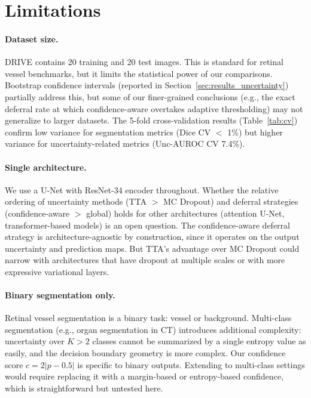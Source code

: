 \section{Limitations}
\label{sec:limitations}

\paragraph{Dataset size.} DRIVE contains 20 training and 20 test images.
This is standard for retinal vessel benchmarks, but it limits the statistical
power of our comparisons. Bootstrap confidence intervals (reported in
Section~\ref{sec:results_uncertainty}) partially address this, but some of
our finer-grained conclusions (e.g., the exact deferral rate at which
confidence-aware overtakes adaptive thresholding) may not generalize to
larger datasets. The 5-fold cross-validation results
(Table~\ref{tab:cv}) confirm low variance for segmentation metrics
(Dice CV $<$ 1\%) but higher variance for uncertainty-related metrics
(Unc-AUROC CV 7.4\%).

\paragraph{Single architecture.} We use a U-Net with ResNet-34 encoder
throughout. Whether the relative ordering of uncertainty methods (TTA $>$
MC Dropout) and deferral strategies (confidence-aware $>$ global) holds
for other architectures (attention U-Net, transformer-based models) is an
open question. The confidence-aware deferral strategy is architecture-agnostic
by construction, since it operates on the output uncertainty and prediction
maps. But TTA's advantage over MC Dropout could narrow with architectures
that have dropout at multiple scales or with more expressive variational
layers.

\paragraph{Binary segmentation only.} Retinal vessel segmentation is a
binary task: vessel or background. Multi-class segmentation (e.g., organ
segmentation in CT) introduces additional complexity: uncertainty over
$K > 2$ classes cannot be summarized by a single entropy value as easily,
and the decision boundary geometry is more complex. Our confidence score
$c = 2|p - 0.5|$ is specific to binary outputs. Extending to multi-class
settings would require replacing it with a margin-based or entropy-based
confidence, which is straightforward but untested here.

